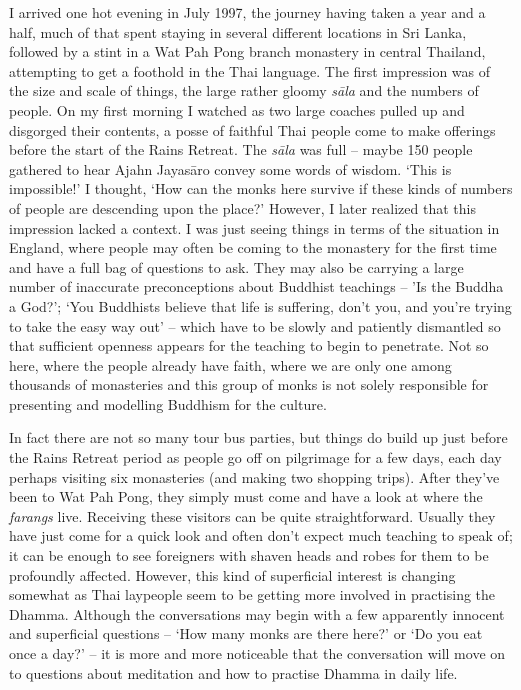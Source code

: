 I arrived one hot evening in July 1997, the journey having taken a year
and a half, much of that spent staying in several different locations in
Sri Lanka, followed by a stint in a Wat Pah Pong branch monastery in
central Thailand, attempting to get a foothold in the Thai language. The
first impression was of the size and scale of things, the large rather
gloomy \emph{sāla} and the numbers of people. On my first morning I
watched as two large coaches pulled up and disgorged their contents, a
posse of faithful Thai people come to make offerings before the start of
the Rains Retreat. The \emph{sāla} was full -- maybe 150 people
gathered to hear Ajahn Jayasāro convey some words of wisdom. `This is
impossible!' I thought, `How can the monks here survive if these kinds
of numbers of people are descending upon the place?' However, I later
realized that this impression lacked a context. I was just seeing things
in terms of the situation in England, where people may often be coming
to the monastery for the first time and have a full bag of questions to
ask. They may also be carrying a large number of inaccurate
preconceptions about Buddhist teachings -- 'Is the Buddha a God?'; `You
Buddhists believe that life is suffering, don't you, and you're trying
to take the easy way out' -- which have to be slowly and patiently
dismantled so that sufficient openness appears for the teaching to begin
to penetrate. Not so here, where the people already have faith, where we
are only one among thousands of monasteries and this group of monks is
not solely responsible for presenting and modelling Buddhism for the
culture. 

In fact there are not so many tour bus parties, but things do build up
just before the Rains Retreat period as people go off on pilgrimage for
a few days, each day perhaps visiting six monasteries (and making two
shopping trips). After they've been to Wat Pah Pong, they simply must
come and have a look at where the \emph{farangs} live. Receiving these
visitors can be quite straightforward. Usually they have just come for a
quick look and often don't expect much teaching to speak of; it can be
enough to see foreigners with shaven heads and robes for them to be
profoundly affected. However, this kind of superficial interest is
changing somewhat as Thai laypeople seem to be getting more involved in
practising the Dhamma. Although the conversations may begin with a few
apparently innocent and superficial questions -- `How many monks are
there here?' or `Do you eat once a day?' -- it is more and more
noticeable that the conversation will move on to questions about
meditation and how to practise Dhamma in daily life. 


